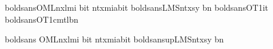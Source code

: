 

 {boldsans}{OML}{nxlmi} {b}{it}
  {ntxmia}{b}{it}
 {boldsans}{LMS}{ntxsy} {b}{n}
\SetMathAlphabet{\mathit} {boldsans}{OT1}{\savesffamily}{\savesfbfseries}{it}
\SetMathAlphabet{\mathtt} {boldsans}{OT1}{cmtl}{b}{n}

 {boldsans}  {OML}{nxlmi} {b}{it}
  {ntxmia}{b}{it}
 {boldsansup}{LMS}{ntxsy} {b}{n}

